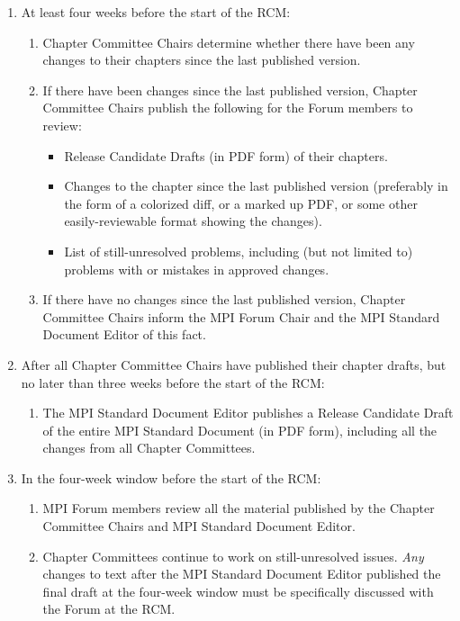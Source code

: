 {{\begin{enumerate}
\item At least four weeks before the start of the RCM:
  \begin{enumerate}
  \item Chapter Committee Chairs determine whether there have been
    any changes to their chapters since the last published version.
  \item If there have been changes since the last published version,
    Chapter Committee Chairs publish the following for the Forum
    members to review:
    \begin{itemize}
      \item Release Candidate Drafts (in PDF form) of their chapters.
      \item Changes to the chapter since the last published version
        (preferably in the form of a colorized diff, or a marked up
        PDF, or some other easily-reviewable format showing the
        changes).
      \item List of still-unresolved problems, including (but not
        limited to) problems with or mistakes in approved changes.
    \end{itemize}
  \item If there have no changes since the last published version,
    Chapter Committee Chairs inform the MPI Forum Chair and the MPI
    Standard Document Editor of this fact.
  \end{enumerate}

\item After all Chapter Committee Chairs have published their chapter
  drafts, but no later than three weeks before the start of the RCM:
  \begin{enumerate}
  \item The MPI Standard Document Editor publishes a Release Candidate
    Draft of the entire MPI Standard Document (in PDF form), including
    all the changes from all Chapter Committees.
  \end{enumerate}

\item In the four-week window before the start of the RCM:
  \begin{enumerate}
  \item MPI Forum members review all the material published by the
    Chapter Committee Chairs and MPI Standard Document Editor.
  \item Chapter Committees continue to work on still-unresolved
    issues.  {\em Any} changes to text after the MPI Standard Document
    Editor published the final draft at the four-week window must be
    specifically discussed with the Forum at the RCM.
  \end{enumerate}


\end{enumerate}}}
